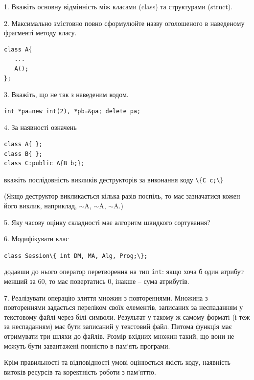 \documentclass[12pt, ukrainian]{article}
\def\code#1{\Verb!#1!}
\begin{document}
{%
1. Вкажіть основну відмінність між класами (class) та структурами (struct).%
\par
\vspace{2mm}
2. Максимально змістовно повно сформулюйте назву оголошеного в наведеному фрагменті методу класу.
\vspace{-3mm}
\begin{verbatim}class A{
   ...
   A();
};\end{verbatim}
\vspace{-3mm}
\par
\vspace{2mm}
3. Вкажіть, що не так з наведеним кодом.
\vspace{-3mm}
\begin{verbatim}int *pa=new int(2), *pb=&pa; delete pa;\end{verbatim}
\vspace{-3mm}
\par
\vspace{2mm}
4. За наявності означень
\vspace{-3mm}
\begin{verbatim}
class A{ };
class B{ };
class C:public A{B b;};\end{verbatim}
\vspace{-3mm}
вкажіть послідовність викликів деструкторів за виконання коду \code{\{C c;\}} 

(Якщо деструктор викликається кілька разів поспіль, то має зазначатися кожен його виклик, наприклад, $\sim$A, $\sim$A, $\sim$A.)

\vspace{2mm}
5. Яку часову оцінку складності має алгоритм швидкого сортування?
\par
\vspace{2mm}
6. Модифікувати клас 

\qquad\code{class Session\{ int DM, MA, Alg, Prog;\};} 


додавши до нього оператор перетворення на тип \code{int}: якщо хоча б один атрибут менший за 60, то має повертатись 0, інакше -- сума атрибутів.%
\par
\vspace{2mm}
7. 
Реалізувати операцію злиття множин з повтореннями. Множина з повтореннями задається переліком своїх елементів, записаних за неспаданням у текстовому файлі через білі символи. Результат у такому ж самому форматі (і теж за неспаданням) має бути записаний у текстовий файл. Питома функція має отримувати три шляхи до файлів. Розмір вхідних множин такий, що вони не можуть бути завантажені повністю в пам’ять програми.

Крім правильності та відповідності умові оцінюється якість коду, наявність витоків ресурсів та коректність роботи з пам'яттю. 

}
\end{document}
